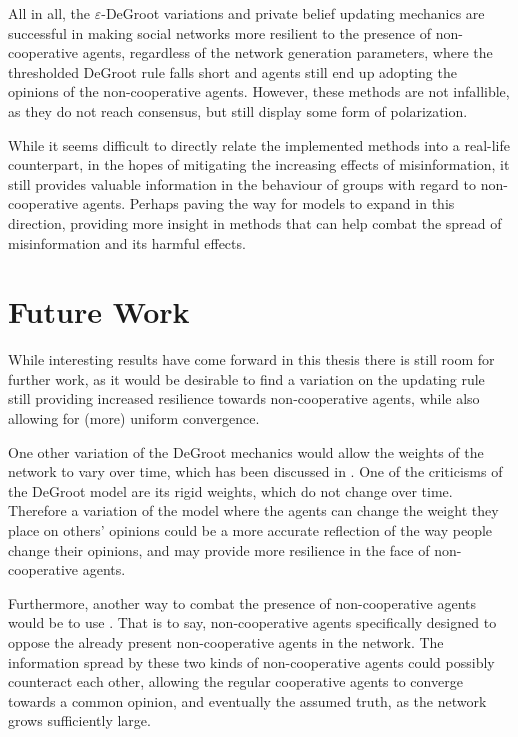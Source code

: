 \documentclass[a4paper, 12pt]{report}
\begin{document}
All in all, the $\varepsilon$-DeGroot variations and private belief updating mechanics are successful in making social networks more resilient to the presence of non-cooperative agents, regardless of the network generation parameters, where the thresholded DeGroot rule falls short and agents still end up adopting the opinions of the non-cooperative agents. However, these methods are not infallible, as they do not reach consensus, but still display some form of polarization.

While it seems difficult to directly relate the implemented methods into a real-life counterpart, in the hopes of mitigating the increasing effects of misinformation, it still provides valuable information in the behaviour of groups with regard to non-cooperative agents. Perhaps paving the way for models to expand in this direction, providing more insight in methods that can help combat the spread of misinformation and its harmful effects.

\newpage

\section{Future Work}

While interesting results have come forward in this thesis there is still room for further work, as it would be desirable to find a variation on the updating rule still providing increased resilience towards non-cooperative agents, while also allowing for (more) uniform convergence.

One other variation of the DeGroot mechanics would allow the weights of the network to vary over time, which has been discussed in \parencite{chatterjee1977stochastic}. One of the criticisms of the DeGroot model are its rigid weights, which do not change over time. Therefore a variation of the model where the agents can change the weight they place on others' opinions could be a more accurate reflection of the way people change their opinions, and may provide more resilience in the face of non-cooperative agents.

Furthermore, another way to combat the presence of non-cooperative agents would be to use . That is to say, non-cooperative agents specifically designed to oppose the already present non-cooperative agents in the network. The information spread by these two kinds of non-cooperative agents could possibly counteract each other, allowing the regular cooperative agents to converge towards a common opinion, and eventually the assumed truth, as the network grows sufficiently large.
\end{document}
